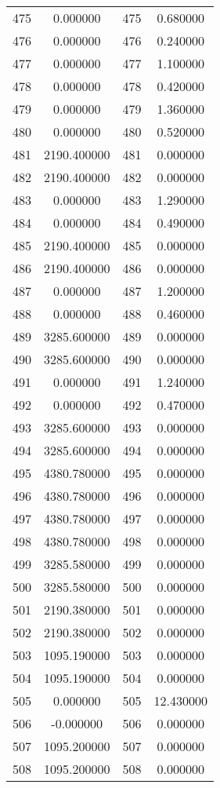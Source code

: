\documentclass[12pt]{article}
\begin{document}
\begin{longtable}{@{}cccc@{}}
475 & 0.000000 & 475 & 0.680000 \\
476 & 0.000000 & 476 & 0.240000 \\
477 & 0.000000 & 477 & 1.100000 \\
478 & 0.000000 & 478 & 0.420000 \\
479 & 0.000000 & 479 & 1.360000 \\
480 & 0.000000 & 480 & 0.520000 \\
481 & 2190.400000 & 481 & 0.000000 \\
482 & 2190.400000 & 482 & 0.000000 \\
483 & 0.000000 & 483 & 1.290000 \\
484 & 0.000000 & 484 & 0.490000 \\
485 & 2190.400000 & 485 & 0.000000 \\
486 & 2190.400000 & 486 & 0.000000 \\
487 & 0.000000 & 487 & 1.200000 \\
488 & 0.000000 & 488 & 0.460000 \\
489 & 3285.600000 & 489 & 0.000000 \\
490 & 3285.600000 & 490 & 0.000000 \\
491 & 0.000000 & 491 & 1.240000 \\
492 & 0.000000 & 492 & 0.470000 \\
493 & 3285.600000 & 493 & 0.000000 \\
494 & 3285.600000 & 494 & 0.000000 \\
495 & 4380.780000 & 495 & 0.000000 \\
496 & 4380.780000 & 496 & 0.000000 \\
497 & 4380.780000 & 497 & 0.000000 \\
498 & 4380.780000 & 498 & 0.000000 \\
499 & 3285.580000 & 499 & 0.000000 \\
500 & 3285.580000 & 500 & 0.000000 \\
501 & 2190.380000 & 501 & 0.000000 \\
502 & 2190.380000 & 502 & 0.000000 \\
503 & 1095.190000 & 503 & 0.000000 \\
504 & 1095.190000 & 504 & 0.000000 \\
505 & 0.000000 & 505 & 12.430000 \\
506 & -0.000000 & 506 & 0.000000 \\
507 & 1095.200000 & 507 & 0.000000 \\
508 & 1095.200000 & 508 & 0.000000 \\

\end{longtable}
\end{document}
